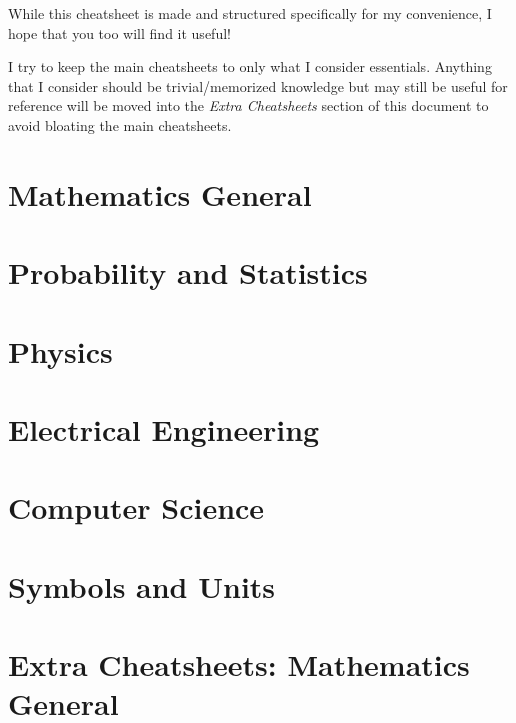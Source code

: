 \documentclass{article}
\begin{document}
\thispagestyle{plain}
\MakeCustomTitle
\bigskip

\medskip
While this cheatsheet is made and structured specifically for my convenience, I hope that you too will find it useful!

I try to keep the main cheatsheets to only what I consider essentials. Anything that I consider should be trivial/memorized knowledge but may still be useful for reference will be moved into the \textit{Extra Cheatsheets} section of this document to avoid bloating the main cheatsheets.
\medskip

{
    \hypersetup{linkcolor=black}
    \tableofcontents
}

\newpage
\section{Mathematics General}
\label{sec:mathgeneral}

    {  }

\newpage
\section{Probability and Statistics}
\label{sec:probability-and-statistics}

    {  }

\newpage
\section{Physics}
\label{sec:physics}

    {  }

\newpage
\section{Electrical Engineering}
\label{sec:ee}

    {  }

\newpage
\section{Computer Science}
\label{sec:compsci}

    {  }

\newpage
\section{Symbols and Units}
\label{sec:units}

    {  }

\newpage
{}

\newpage
\section{Extra Cheatsheets: Mathematics General}%
\label{sec:extrasec-mathgeneral}

    {  }
\end{document}
